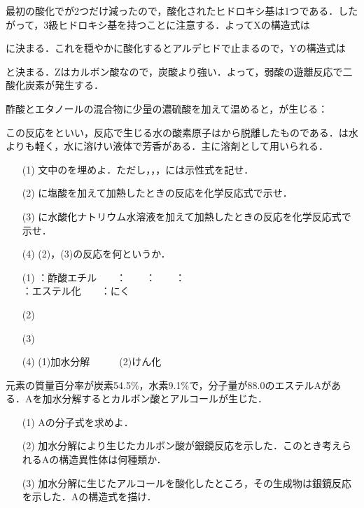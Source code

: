 \documentclass[a4paper,12pt]{ltjsreport}
\begin{document}
\ans
最初の酸化でが2つだけ減ったので，酸化されたヒドロキシ基は1つである．したがって，3級ヒドロキシ基を持つことに注意する．よってXの構造式は
\begin{figure}[H]
    \centering
\end{figure}
に決まる．これを穏やかに酸化するとアルデヒドで止まるので，Yの構造式は
\begin{figure}[H]
    \centering
\end{figure}
と決まる．Zはカルボン酸なので，炭酸より強い．よって，弱酸の遊離反応で二酸化炭素が発生する．
\newpage
    \begin{que}
    酢酸とエタノールの混合物に少量の濃硫酸を加えて温めると，が生じる：\\
\centerline{}
この反応をといい，反応で生じる水の酸素原子はから脱離したものである．は水よりも軽く，水に溶けい液体で芳香がある．主に溶剤として用いられる．
\begin{itemize}
    \item [(1)]文中の\fbox{　}を埋めよ．ただし，，，には示性式を記せ．
    \item [(2)]に塩酸を加えて加熱したときの反応を化学反応式で示せ．
    \item [(3)]に水酸化ナトリウム水溶液を加えて加熱したときの反応を化学反応式で示せ．
    \item [(4)](2)，(3)の反応を何というか．
\end{itemize}
\end{que}
\ans 
\begin{itemize}
    \item [(1)]：酢酸エチル　　：　　：　　：　　\\：エステル化　　：にく\\
    \item[(2)]\\[10pt]
    \item[(3)]\\[10pt]
    \item[(4)](1)加水分解　　　(2)けん化  
\end{itemize}
\newpage
\begin{que}
元素の質量百分率が炭素54.5$\%$，水素9.1$\%$で，分子量が88.0のエステルAがある．Aを加水分解するとカルボン酸とアルコールが生じた．
\begin{itemize}
    \item[(1)]Aの分子式を求めよ．
    \item [(2)]加水分解により生じたカルボン酸が銀鏡反応を示した．このとき考えられるAの構造異性体は何種類か．
    \item [(3)]加水分解に生じたアルコールを酸化したところ，その生成物は銀鏡反応を示した．Aの構造式を描け．
\end{itemize}
\end{que}
\end{document}
